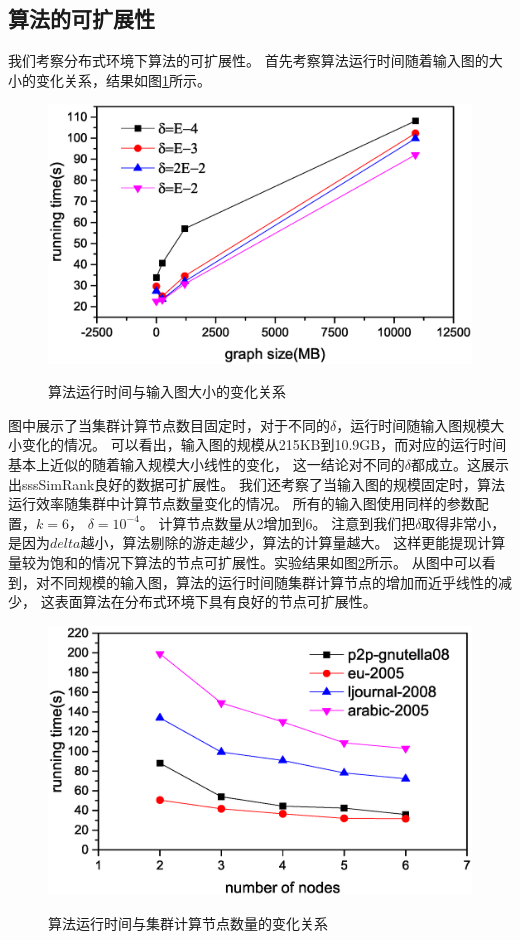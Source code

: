 \documentclass[master]{njuthesis}
\begin{document}
\subsection{算法的可扩展性}
我们考察分布式环境下算法的可扩展性。 首先考察算法运行时间随着输入图的大小的变化关系，结果如图\ref{fig:ch1:data_scalable}所示。
\begin{figure}[h]
  \centering
  \includegraphics[width= 1\textwidth]{figure/data_scalability.eps}\\
  \caption{算法运行时间与输入图大小的变化关系}\label{fig:ch1:data_scalable}
\end{figure}

图中展示了当集群计算节点数目固定时，对于不同的$\delta$，运行时间随输入图规模大小变化的情况。 
可以看出，输入图的规模从215KB到10.9GB，而对应的运行时间基本上近似的随着输入规模大小线性的变化，
这一结论对不同的$\delta$都成立。这展示出sssSimRank良好的数据可扩展性。
我们还考察了当输入图的规模固定时，算法运行效率随集群中计算节点数量变化的情况。
所有的输入图使用同样的参数配置，$k=6$， $\delta=10^{-4}$。 计算节点数量从2增加到6。
注意到我们把$\delta$取得非常小，是因为$delta$越小，算法剔除的游走越少，算法的计算量越大。
这样更能提现计算量较为饱和的情况下算法的节点可扩展性。实验结果如图\ref{fig:ch1:node_scalable}所示。
从图中可以看到，对不同规模的输入图，算法的运行时间随集群计算节点的增加而近乎线性的减少，
这表面算法在分布式环境下具有良好的节点可扩展性。
\begin{figure}[h]
  \centering
  \includegraphics[width= 1\textwidth]{figure/node_scalability.eps}\\
  \caption{算法运行时间与集群计算节点数量的变化关系}\label{fig:ch1:node_scalable}
\end{figure}
\end{document}
